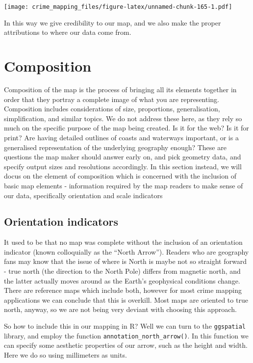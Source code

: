 \documentclass[
  krantz2]{krantz}
\begin{document}
\texttt{[image: crime\_mapping\_files/figure-latex/unnamed-chunk-165-1.pdf]}

In this way we give credibility to our map, and we also make the proper attributions to where our data come from.

\hypertarget{composition}{%
\section{Composition}\label{composition}}

Composition of the map is the process of bringing all its elements together in order that they portray a complete image of what you are representing. Composition includes considerations of size, proportions, generalisation, simplification, and similar topics. We do not address these here, as they rely so much on the specific purpose of the map being created. Is it for the web? Is it for print? Are having detailed outlines of coasts and waterways important, or is a generalised representation of the underlying geography enough? These are questions the map maker should answer early on, and pick geometry data, and specify output sizes and resolutions accordingly. In this section instead, we will docus on the element of composition which is concerned with the inclusion of basic map elements - information required by the map readers to make sense of our data, specifically orientation and scale indicators

\hypertarget{orientation-indicators}{%
\subsection{Orientation indicators}\label{orientation-indicators}}

It used to be that no map was complete without the inclusion of an orientation indicator (known colloquially as the ``North Arrow''). Readers who are geography fans may know that the issue of where is North is maybe not so straight forward - true north (the direction to the North Pole) differs from magnetic north, and the latter actually moves around as the Earth's geophysical conditions change. There are reference maps which include both, however for most crime mapping applications we can conclude that this is overkill. Most maps are oriented to true north, anyway, so we are not being very deviant with choosing this approach.

So how to include this in our mapping in R? Well we can turn to the \texttt{ggspatial} library, and employ the function \texttt{annotation\_north\_arrow()}. In this function we can specify some aesthetic properties of our arrow, such as the height and width. Here we do so using millimeters as units.
\end{document}
